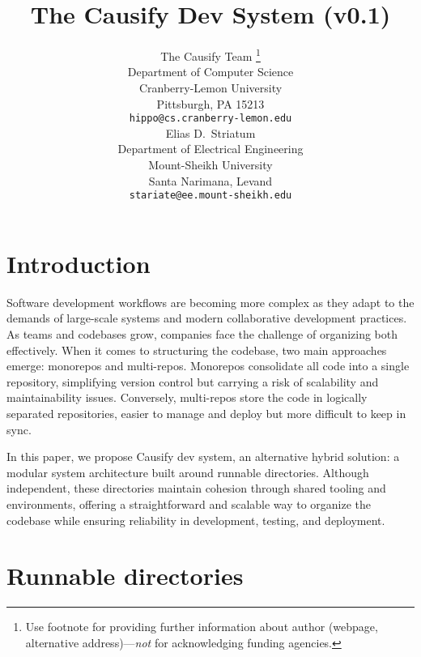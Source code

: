 \documentclass{article}
\title{The Causify Dev System (v0.1)}
\author{ The Causify Team
\thanks{Use footnote for providing further information about author (webpage,
alternative address)---\emph{not} for acknowledging funding agencies.} \\
Department of Computer Science\\
Cranberry-Lemon University\\
Pittsburgh, PA
15213
\\ \texttt{hippo@cs.cranberry-lemon.edu} \\
\And
Elias D.~Striatum \\
Department of Electrical Engineering\\
Mount-Sheikh University\\
Santa Narimana, Levand \\
\texttt{stariate@ee.mount-sheikh.edu} \\
}
\begin{document}
  \maketitle

  \begin{abstract}
  \end{abstract}


  \section{Introduction}
  Software development workflows are becoming more complex as they adapt to the
  demands of large-scale systems and modern collaborative development practices.
  As teams and codebases grow, companies face the challenge of organizing both
  effectively. When it comes to structuring the codebase, two main approaches
  emerge: monorepos and multi-repos. Monorepos consolidate all code into a
  single repository, simplifying version control but carrying a risk of
  scalability and maintainability issues. Conversely, multi-repos store the code
  in logically separated repositories, easier to manage and deploy but more
  difficult to keep in sync.

  In this paper, we propose Causify dev system, an alternative hybrid solution: a
  modular system architecture built around runnable directories. Although
  independent, these directories maintain cohesion through shared tooling and
  environments, offering a straightforward and scalable way to organize the
  codebase while ensuring reliability in development, testing, and deployment.


  \section{Runnable directories}
\end{document}
